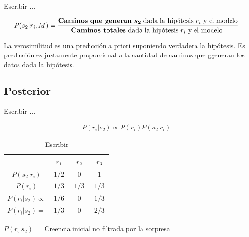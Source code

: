 \documentclass[a4paper,10pt]{book}
\begin{document}
Escribir ...

\begin{framed}
\begin{align*}
  P(s_2|r_i, M) = \frac{\text{\textbf{Caminos que generan} $\bm{s_2}$ dada la hipótesis $r_i$ y el modelo}}{\text{\textbf{Caminos totales} dada la hipótesis $r_i$ y el modelo }}
 \end{align*}
 \end{framed}

  La verosimilitud es una predicción a priori suponiendo verdadera la hipótesis.
  Es predicción es justamente proporcional a la cantidad de caminos que ggeneran los datos dada la hipótesis.

 \subsection{Posterior}
 
 Escribir ... 
 
 \begin{align*}
   P(r_i|s_2) \propto P(r_i) P(s_2|r_i) 
  \end{align*}
 

 \begin{table}[H]
   \centering
  \begin{tabular}{c|c|c|c} \setlength\tabcolsep{0.4cm} 
        \phantom{$P(r_i|s_2) \propto$}  & \, $r_1$ \, &  \, $r_2$ \, & \, $r_3$ \, \\ \hline 
   $P(s_2|r_i)$ & $1/2$ & $0$ & $1$  \\ \hline
   $P(r_i)$ & $1/3$ & $1/3$ & $1/3$  \\ \hline
   $P(r_i|s_2) \propto$ & $1/6$ & $0$ & $1/3$  \\ \hline \hline
   $P(r_i|s_2) =$ & $1/3$ & $0$ & $2/3$  \\ \hline 
\end{tabular}
\caption{Escribir}
\label{tab:posterior}
\end{table}


 \begin{framed}\centering
 $P(r_i|s_2) = $ Creencia inicial no filtrada por la sorpresa
 \end{framed}

  
 
\end{document}
